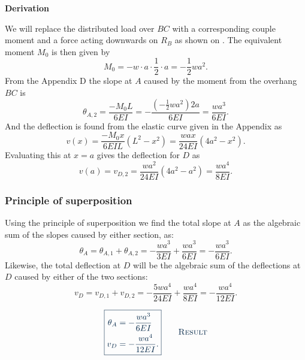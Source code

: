 \documentclass[a4paper]{article}
\numberwithin{equation}{problem}
\newcommand{\AUheading}[1]{%
  \par\vspace{.4\baselineskip}%
  {\sffamily\bfseries\color{AUblueDark}#1\par}%
  \nobreak%
}
\newenvironment{derivation}[1][Derivation]{%
  \AUheading{#1}
  \begingroup\allowdisplaybreaks
  \setlength{\abovedisplayskip}{6pt}%
  \setlength{\belowdisplayskip}{6pt}%
  \setlength{\abovedisplayshortskip}{4pt}%
  \setlength{\belowdisplayshortskip}{4pt}%
}{\par\endgroup\medskip}
\newcommand{\finalresult}[1]{%
  \vspace{.2\baselineskip}%
  \begin{equation}
    {\color{AUblueDark}\boxed{\displaystyle #1}}
    \tag*{\textsc{\textcolor{AUblueDark}{Result}}}
  \end{equation}
  \newpage
}
\begin{document}
\begin{derivation}
  We will replace the distributed load over $BC$ with a corresponding couple moment and a force acting downwards on $R_B$ as shown on .
  The equivalent moment $M_{0}$ is then given by
  \begin{equation*}
    M_{0} = - w \cdot a \cdot \frac{1}{2} \cdot a = - \frac{1}{2} w a^2
  .\end{equation*}
  From the Appendix D the slope at $A$ caused by the moment from the overhang $BC$ is
  \begin{equation*}
    \theta_{A,2} = \frac{- M_0 L}{6 EI} = - \frac{\left( - \frac{1}{2}w a^2 \right) 2a}{6 EI} = \frac{w a^3}{6 EI}
  .\end{equation*}
  And the deflection is found from the elastic curve given in the Appendix as
  \begin{equation*}
    v(x) = \frac{- M_0 x}{6 EIL} \left( L^2 - x^2 \right) = \frac{wax}{24 EI} \left( 4a^2 - x^2 \right)
  .\end{equation*}
  Evaluating this at $x = a$ gives the deflection for $D$ as
  \begin{equation*}
    v(a) = v_{D,2} = \frac{w a^2}{24 EI} \left( 4a^2 - a^2 \right) = \frac{wa^{4}}{8 EI}
  .\end{equation*}
  
  \subsubsection*{Principle of superposition}
  Using the principle of superposition we find the total slope at $A$ as the algebraic sum of the slopes caused by either section, as:
  \begin{equation*}
    \theta_A = \theta_{A,1} + \theta_{A,2} = -\frac{w a^3}{3 EI} + \frac{wa^3}{6EI} = - \frac{wa^3}{6EI}
  .\end{equation*}
  Likewise, the total deflection at $D$ will be the algebraic sum of the deflections at $D$ caused by either of the two sections:
  \begin{equation*}
    v_{D} = v_{D,1} + v_{D,2} = - \frac{5 w a^{4}}{24 EI} + \frac{wa^{4}}{8 EI} = - \frac{wa^{4}}{12EI}
  .\end{equation*}
\end{derivation}

\finalresult{
\begin{aligned}
  \theta_A &= - \frac{wa^3}{6 EI} \\
  v_D &= - \frac{wa^{4}}{12 EI}
.\end{aligned}
}
\end{document}
